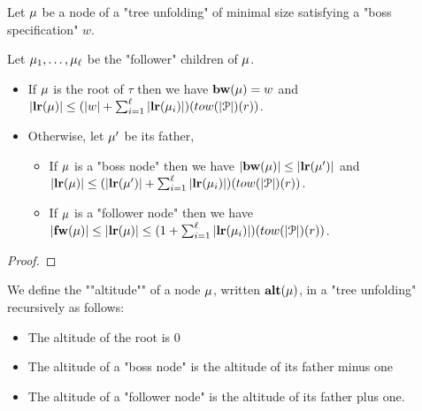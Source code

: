 \begin{lemma}
	\label{lem:bound-successor-height}
	Let $\mu$ be a node of a "tree unfolding" of minimal size satisfying a "boss specification" $w$.
	
	Let $\mu_1, \ldots, \mu_\ell$ be the "follower" children of $\mu$. 
	
	\begin{itemize}
		\item If $\mu$ is the root of $\tau$ then we have $\mathbf{bw}(\mu) = w$ and $\size{\localrunlabel{\node}} \leq (\size{w} + \sum_{i=1}^{\ell} \size{\localrunlabel{\node_i}}) (\towerfun(\size{\prot})(r))$. 
		
		\item Otherwise, let $\mu'$ be its father, 
		\begin{itemize}
			\item If $\mu$ is a "boss node" then we have $|\mathbf{bw}(\mu)| \leq |\mathbf{lr}(\mu')|$ and $\size{\localrunlabel{\node}} \leq (\size{\localrunlabel{\node'}} + \sum_{i=1}^{\ell} \size{\localrunlabel{\node_i}}) (\towerfun(\size{\prot})(r))$. 
			
			\item If $\mu$ is a "follower node" then we have $\size{\followlabelword{\node}} \leq \size{\localrunlabel{\node}} \leq (1 +\sum_{i=1}^{\ell} \size{\localrunlabel{\node_i}}) (\towerfun(\size{\prot})(r))$. 
		\end{itemize}
	\end{itemize}
\end{lemma}

\ifproofs
\begin{proof}
\end{proof}
\fi

\begin{definition}
	We define the ""altitude"" of a node $\mu$, written $\mathbf{alt(\mu)}$, in a "tree unfolding" recursively as follows:
	\begin{itemize}
		\item The altitude of the root is $0$
		
		\item The altitude of a "boss node" is the altitude of its father minus one
		
		\item The altitude of a "follower node" is the altitude of its father plus one.
	\end{itemize}
\end{definition}

